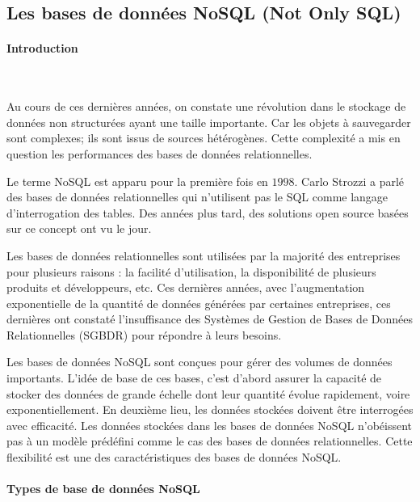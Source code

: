 	
	\subsection{Les bases de données NoSQL (Not Only SQL) } \label{sec:nosql}
	
	
	\paragraph{Introduction } ~
	
    Au cours de ces dernières années, on constate une révolution dans le stockage de données non structurées ayant une taille importante.  Car les objets à sauvegarder sont complexes; ils sont issus de sources hétérogènes.  Cette complexité a mis en question les performances des bases de données relationnelles. 
	
	Le terme NoSQL est apparu pour la première fois en $ 1998 $. Carlo Strozzi  a parlé des bases de données relationnelles qui n'utilisent pas le SQL comme langage d'interrogation des tables. Des années plus tard, des solutions  open source basées sur ce concept ont vu le jour. 
	
	Les bases de données relationnelles sont utilisées par la majorité des entreprises pour plusieurs raisons :   la facilité d'utilisation, la disponibilité de plusieurs produits et développeurs, etc. Ces dernières années, avec l'augmentation exponentielle de la quantité de données générées par certaines entreprises, ces dernières ont constaté l'insuffisance des Systèmes de Gestion de Bases de Données Relationnelles (SGBDR) pour répondre à leurs besoins.
	
	
	Les bases de données NoSQL sont conçues pour gérer des  volumes de données importants. L'idée de base de ces bases, c'est d'abord assurer la capacité de stocker des données de grande échelle dont leur  quantité  évolue rapidement, voire exponentiellement.  En deuxième lieu, les données stockées  doivent être interrogées  avec efficacité. Les données stockées dans  les bases de données NoSQL n'obéissent pas à un modèle prédéfini comme le cas des bases de données relationnelles. Cette flexibilité est une des caractéristiques des bases de données NoSQL.
	
	
	\paragraph{Types de base de données NoSQL} \label{sec:nosql-database}  ~
	
